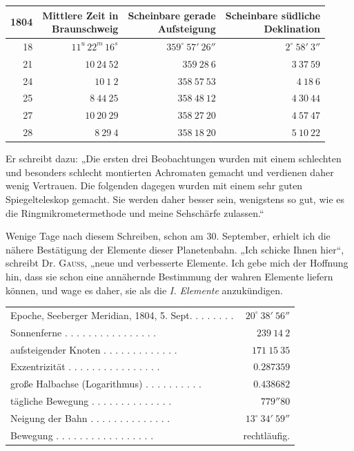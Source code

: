 \begin{center}
\begingroup\fontsize{9}{11}\selectfont\setlength{\tabcolsep}{3pt}\renewcommand{\arraystretch}{1.12}
\begin{tabular}{r|r|r|r}
1804 & \shortstack{Mittlere Zeit in\\Braunschweig} & \shortstack{Scheinbare gerade\\Aufsteigung} & \shortstack{Scheinbare südliche\\Deklination} \\ \hline
18 & $11^{u}\,22^{m}\,16^{s}$ & $359^\circ\ 57'\ 26''$ & $2^\circ\ 58'\ 3''$ \\
21 & $10\ 24\ 52$ & $359\ 28\ 6$ & $3\ 37\ 59$ \\
24 & $10\ 1\ 2$ & $358\ 57\ 53$ & $4\ 18\ 6$ \\
25 & $8\ 44\ 25$ & $358\ 48\ 12$ & $4\ 30\ 44$ \\
27 & $10\ 20\ 29$ & $358\ 27\ 20$ & $4\ 57\ 47$ \\
28 & $8\ 29\ 4$ & $358\ 18\ 20$ & $5\ 10\ 22$ \\
\end{tabular}\endgroup
\end{center}

Er schreibt dazu: „Die ersten drei Beobachtungen wurden mit einem schlechten und besonders schlecht montierten Achromaten gemacht und verdienen daher wenig Vertrauen. Die folgenden dagegen wurden mit einem sehr guten Spiegelteleskop gemacht. Sie werden daher besser sein, wenigstens so gut, wie es die Ringmikrometermethode und meine Sehschärfe zulassen.“

Wenige Tage nach diesem Schreiben, schon am 30. September, erhielt ich die nähere Bestätigung der Elemente dieser Planetenbahn. „Ich schicke Ihnen hier“, schreibt Dr. \textsc{Gauss}, „neue und verbesserte Elemente. Ich gebe mich der Hoffnung hin, dass sie schon eine annähernde Bestimmung der wahren Elemente liefern können, und wage es daher, sie als die \textit{I. Elemente} anzukündigen.

\begin{center}
\begingroup\fontsize{9}{11}\selectfont\setlength{\tabcolsep}{3pt}
\begin{tabular}{lr}
Epoche, Seeberger Meridian, 1804, 5. Sept. . . . . . . . & $20^\circ\ 38'\ 56''$ \\
Sonnenferne . . . . . . . . . . . . . . . . & $239\ 14\ 2$ \\
aufsteigender Knoten . . . . . . . . . . . . . & $171\ 15\ 35$ \\
Exzentrizität . . . . . . . . . . . . . . . . & $0.287359$ \\
große Halbachse (Logarithmus) . . . . . . . . . . & $0.438682$ \\
tägliche Bewegung . . . . . . . . . . . . . . & $779''80$ \\
Neigung der Bahn . . . . . . . . . . . . . . & $13^\circ\ 34'\ 59''$ \\
Bewegung . . . . . . . . . . . . . . . . . & rechtläufig. \\
\end{tabular}\endgroup
\end{center}

